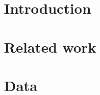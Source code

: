 \documentclass[11pt]{article}
\begin{document}


\section{Introduction}

\section{Related work}

\section{Data}
\end{document}

